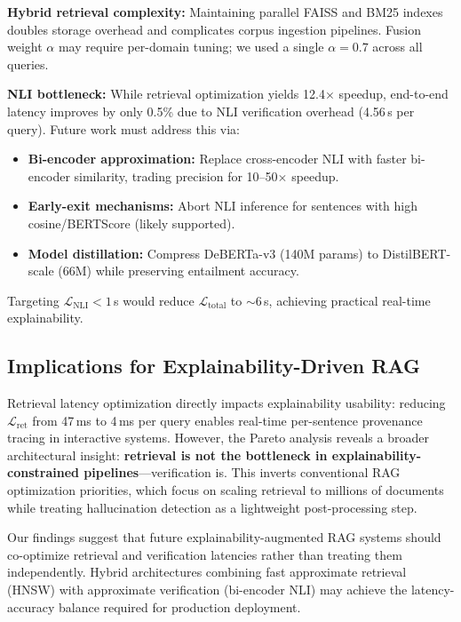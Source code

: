 \documentclass[conference]{IEEEtran}
\begin{document}
\textbf{Hybrid retrieval complexity:} Maintaining parallel FAISS and BM25 indexes doubles storage overhead and complicates corpus ingestion pipelines. Fusion weight $\alpha$ may require per-domain tuning; we used a single $\alpha{=}0.7$ across all queries.

\textbf{NLI bottleneck:} While retrieval optimization yields 12.4$\times$ speedup, end-to-end latency improves by only 0.5\% due to NLI verification overhead (4.56\,s per query). Future work must address this via:
\begin{itemize}
    \item \textbf{Bi-encoder approximation:} Replace cross-encoder NLI with faster bi-encoder similarity, trading precision for 10--50$\times$ speedup.
    \item \textbf{Early-exit mechanisms:} Abort NLI inference for sentences with high cosine/BERTScore (likely supported).
    \item \textbf{Model distillation:} Compress DeBERTa-v3 (140M params) to DistilBERT-scale (66M) while preserving entailment accuracy.
\end{itemize}

Targeting $\mathcal{L}_{\mathrm{NLI}} < 1$\,s would reduce $\mathcal{L}_{\mathrm{total}}$ to $\sim$6\,s, achieving practical real-time explainability.

\subsection{Implications for Explainability-Driven RAG}

Retrieval latency optimization directly impacts explainability usability: reducing $\mathcal{L}_{\mathrm{ret}}$ from 47\,ms to 4\,ms per query enables real-time per-sentence provenance tracing in interactive systems. However, the Pareto analysis reveals a broader architectural insight: \textbf{retrieval is not the bottleneck in explainability-constrained pipelines}—verification is. This inverts conventional RAG optimization priorities, which focus on scaling retrieval to millions of documents \cite{izacard2022atlas} while treating hallucination detection as a lightweight post-processing step.

Our findings suggest that future explainability-augmented RAG systems should co-optimize retrieval and verification latencies rather than treating them independently. Hybrid architectures combining fast approximate retrieval (HNSW) with approximate verification (bi-encoder NLI) may achieve the latency-accuracy balance required for production deployment.
\end{document}

